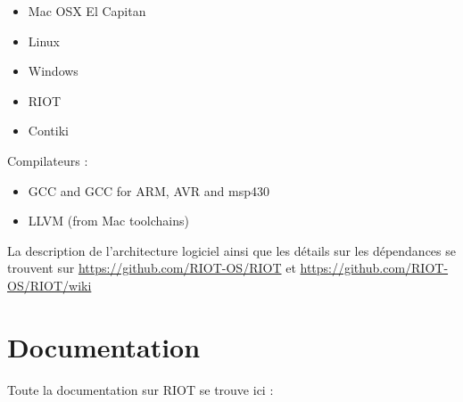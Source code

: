 \documentclass[a4paper, twoside]{article}
\newenvironment{notes}[0]{\color{blue}}{\color{black}}
\begin{document}
\begin{itemize}
	\item Mac OSX El Capitan
	\item Linux
	\item Windows
	\item RIOT
	\item Contiki\\
\end{itemize}

Compilateurs :
\begin{itemize}
	\item GCC and GCC for ARM, AVR and msp430
	\item LLVM (from Mac toolchains)\\
\end{itemize}

La description de l'architecture logiciel ainsi que les détails sur les dépendances se trouvent sur \url{https://github.com/RIOT-OS/RIOT} et \url{https://github.com/RIOT-OS/RIOT/wiki}








\section{Documentation}
Toute la documentation sur RIOT se trouve ici : \\
\end{document}
